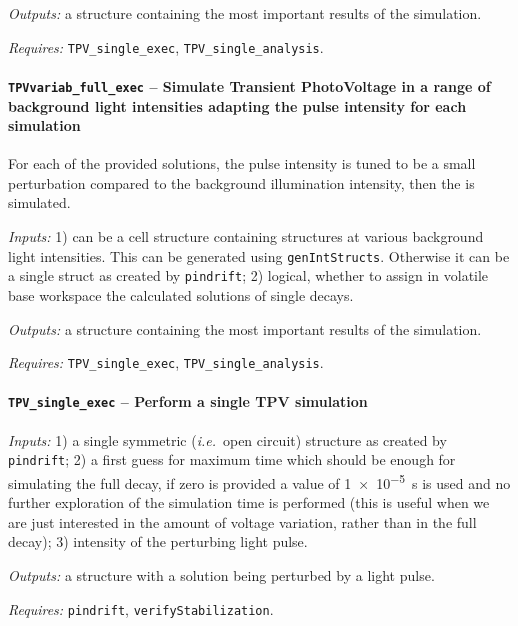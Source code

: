 		\textit{Outputs:} a structure containing the most important results of the simulation.
		
		\textit{Requires:} \texttt{TPV\_single\_exec}, \texttt{TPV\_single\_analysis}.
		
		
		
				\paragraph{\texttt{TPV\-variab\_full\_exec} -- Simulate Transient PhotoVoltage in a range of background light intensities adapting the pulse intensity for each simulation}
				For each of the provided solutions, the pulse intensity is tuned to be a small perturbation compared to the background illumination intensity, then the  is simulated.
				
				\textit{Inputs:} 1) can be a cell structure containing structures at various background
				light intensities. This can be generated using \texttt{gen\-Int\-Structs}.
				Otherwise it can be a single struct as created by \texttt{pin\-drift};
				2) logical, whether to assign in volatile base
				workspace the calculated solutions of single \acr{tpv} decays.
				
				\textit{Outputs:} a structure containing the most important results of the simulation.
				
				\textit{Requires:} \texttt{TPV\_single\_exec}, \texttt{TPV\_single\_analysis}.
		
		
		\paragraph{\texttt{TPV\_single\_exec} -- Perform a single TPV simulation}
		
		\textit{Inputs:} 1) a single symmetric (\textsl{i.e.}\ open circuit) structure as created by \texttt{pin\-drift};
		2) a first guess for maximum time which should be enough for simulating the full decay, if zero is provided a value of \SI{1e-5}{\s} is used and no further exploration of the simulation time is performed (this is useful when we are just interested in the amount of voltage variation, rather than in the full decay);
		3) intensity of the perturbing light pulse.
		
		\textit{Outputs:} a structure with a solution being perturbed by a light pulse.
		
		\textit{Requires:} \texttt{pin\-drift}, \texttt{verify\-Stabilization}.
		
